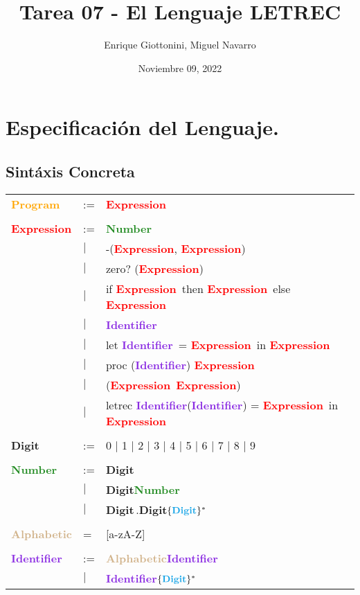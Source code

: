 \documentclass[11pt]{article}
\title{ Tarea 07 - El Lenguaje LETREC}
\author{ Enrique Giottonini, Miguel Navarro }
\date{Noviembre 09, 2022}
\newcommand\Program{\textcolor{Orange}{\textbf{Program}}}
\newcommand\Expression{\textcolor{Red}{\textbf{Expression}}}
\newcommand\Number{\textcolor{ForestGreen}{\textbf{Number}}}
\newcommand\Identifier{\textcolor{BlueViolet}{\textbf{Identifier}}}
\newcommand\Digit{\textcolor{Cerulean}{\textbf{Digit}}}
\newcommand\Alphab{\textcolor{Tan}{\textbf{Alphabetic}}}
\begin{document}
\maketitle	

\section*{Especificación del Lenguaje.}
\subsection*{Sintáxis Concreta}
\begin{table}[h]
\begin{tabular}{lll}
\Program    & :=  & \Expression \\ \\
\Expression & :=  & \Number                                                           	\\
            & $|$ & -(\Expression, \Expression)                                   		\\
            & $|$ & zero? (\Expression)                                          	 	\\
            & $|$ & if \Expression \, then \Expression \, else \Expression        		\\
            & $|$ & \Identifier                                                  		\\
            & $|$ & let \Identifier \, = \Expression \,  in \Expression           		\\
            & $|$ & proc (\Identifier) \Expression                                		\\
            & $|$ & (\Expression \, \Expression)                                  		\\
            & $|$ & letrec \Identifier(\Identifier) = \Expression \, in \Expression  \\ \\
\Digit      & :=  & 0 $|$  1 $|$ 2 $|$ 3 $|$ 4 $|$ 5 $|$ 6 $|$ 7 $|$ 8 $|$ 9      	\\ \\
\Number     & :=  & \Digit                       		\\
            & $|$ & \Digit \Number         				\\
            & $|$ & \Digit \,.\Digit$\{\Digit\}^*$   \\ \\
\Alphab     &  =  & [a-zA-Z]                         \\ \\
\Identifier & :=  & \Alphab\Identifier                  \\
            & $|$ & \Identifier$\{\Digit\}^*$           \\
                                                       
\end{tabular}
\end{table}
\newpage
\end{document}
